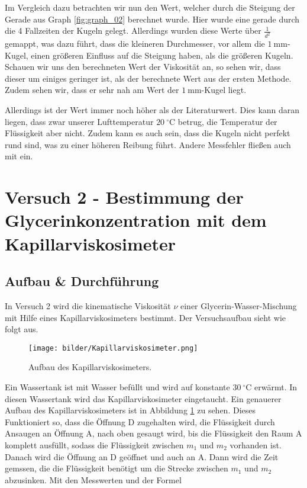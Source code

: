             Im Vergleich dazu betrachten wir nun den Wert, welcher durch die Steigung der Gerade aus Graph \ref{fig:graph_02} berechnet wurde. Hier wurde eine gerade durch die 4 Fallzeiten der Kugeln gelegt. Allerdings wurden diese Werte über $\frac{1}{d^{2}}$ gemappt, was dazu führt, dass die kleineren Durchmesser, vor allem die $1\ \mathrm{mm}$-Kugel, einen größeren Einfluss auf die Steigung haben, als die größeren Kugeln. Schauen wir uns den berechneten Wert der Viskosität an, so sehen wir, dass dieser um einiges geringer ist, als der berechnete Wert aus der ersten Methode. Zudem sehen wir, dass er sehr nah am Wert der $1\ \mathrm{mm}$-Kugel liegt.

            Allerdings ist der Wert immer noch höher als der Literaturwert. Dies kann daran liegen, dass zwar unserer Lufttemperatur $20\ \mathrm{^\circ C}$ betrug, die Temperatur der Flüssigkeit aber nicht. Zudem kann es auch sein, dass die Kugeln nicht perfekt rund sind, was zu einer höheren Reibung führt. Andere Messfehler fließen auch mit ein.
        
    \section{Versuch 2 - Bestimmung der Glycerinkonzentration mit dem Kapillarviskosimeter}
    \label{sec:Versuch2}

        \subsection{Aufbau \& Durchführung}
            
            In Versuch 2 wird die kinematische Viskosität $\nu$ einer Glycerin-Wasser-Mischung mit Hilfe eines Kapillarviskosimeters bestimmt. Der Versuchsaufbau sieht wie folgt aus.

            \begin{figure}[h]
                \centering
                \texttt{[image: bilder/Kapillarviskosimeter.png]}
                \caption{Aufbau des Kapillarviskosimeters.}
                \label{fig:Kapillarviskosimeter}
            \end{figure}

            Ein Wassertank ist mit Wasser befüllt und wird auf konstante $30\ \mathrm{^\circ C}$ erwärmt. In diesen Wassertank wird das Kapillarviskosimeter eingetaucht. Ein genauerer Aufbau des Kapillarviskosimeters ist in Abbildung \ref{fig:Kapillarviskosimeter} zu sehen. Dieses Funktioniert so, dass die Öffnung D zugehalten wird, die Flüssigkeit durch Ansaugen an Öffnung A, nach oben gesaugt wird, bis die Flüssigkeit den Raum A komplett ausfüllt, sodass die Flüssigkeit zwischen $m_1$ und $m_2$ vorhanden ist. Danach wird die Öffnung an D geöffnet und auch an A. Dann wird die Zeit gemssen, die die Flüssigkeit benötigt um die Strecke zwischen $m_{1}$ und $m_{2}$ abzusinken. Mit den Messwerten und der Formel


